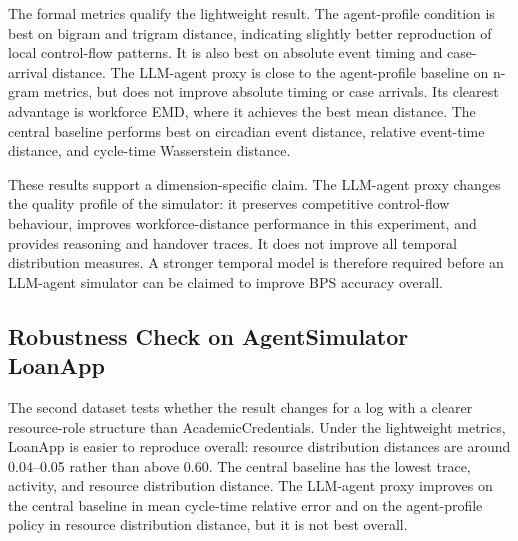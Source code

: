 The formal metrics qualify the lightweight result. The agent-profile
condition is best on bigram and trigram distance, indicating slightly
better reproduction of local control-flow patterns. It is also best on
absolute event timing and case-arrival distance. The LLM-agent proxy is
close to the agent-profile baseline on n-gram metrics, but does not
improve absolute timing or case arrivals. Its clearest advantage is
workforce EMD, where it achieves the best mean distance. The central
baseline performs best on circadian event distance, relative event-time
distance, and cycle-time Wasserstein distance.

These results support a dimension-specific claim. The LLM-agent proxy
changes the quality profile of the simulator: it preserves competitive
control-flow behaviour, improves workforce-distance performance in this
experiment, and provides reasoning and handover traces. It does not
improve all temporal distribution measures. A stronger temporal model is
therefore required before an LLM-agent simulator can be claimed to
improve BPS accuracy overall.

\subsection{Robustness Check on AgentSimulator
LoanApp}\label{robustness-check-on-agentsimulator-loanapp}

The second dataset tests whether the result changes for a log with a
clearer resource-role structure than AcademicCredentials. Under the
lightweight metrics, LoanApp is easier to reproduce overall: resource
distribution distances are around 0.04--0.05 rather than above 0.60.
The central baseline has the lowest trace, activity, and resource
distribution distance. The LLM-agent proxy improves on the central
baseline in mean cycle-time relative error and on the agent-profile
policy in resource distribution distance, but it is not best overall.

